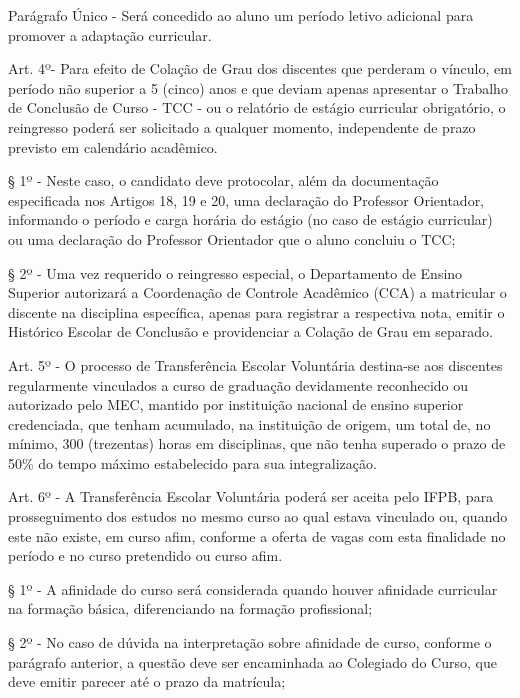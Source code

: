 Parágrafo Único - Será concedido ao aluno um período letivo adicional para promover a adaptação curricular.

\vspace{1mm}
Art. 4º- Para efeito de Colação de Grau dos discentes que perderam o vínculo, em período não superior a 5 (cinco) anos e que deviam apenas apresentar o Trabalho de Conclusão de Curso - TCC - ou o relatório de estágio curricular obrigatório, o reingresso poderá ser solicitado a qualquer momento, independente de prazo previsto em calendário acadêmico.

	§ 1º - Neste caso, o candidato deve protocolar, além da documentação especificada nos Artigos 18, 19 e 20, uma declaração do Professor Orientador, informando o período e carga horária do estágio (no caso de estágio curricular) ou uma declaração do Professor Orientador que o aluno concluiu o TCC;

	§ 2º - Uma vez requerido o reingresso especial, o Departamento de Ensino Superior autorizará a Coordenação de Controle Acadêmico (CCA) a matricular o discente na disciplina específica, apenas para registrar a respectiva nota, emitir o Histórico Escolar de Conclusão e providenciar a Colação de Grau em separado.

\vspace{1mm}
Art. 5º - O processo de Transferência Escolar Voluntária destina-se aos discentes regularmente vinculados a curso de graduação devidamente reconhecido ou autorizado pelo MEC, mantido por instituição nacional de ensino superior credenciada, que tenham acumulado, na instituição de origem, um total de, no mínimo, 300 (trezentas) horas em disciplinas, que não tenha superado o prazo de 50\% do tempo máximo estabelecido para sua integralização.

\vspace{1mm}
Art. 6º - A Transferência Escolar Voluntária poderá ser aceita pelo IFPB, para prosseguimento dos estudos no mesmo curso ao qual estava vinculado ou, quando este não existe, em curso afim, conforme a oferta de vagas com esta finalidade no período e no curso pretendido ou curso afim.

§ 1º - A afinidade do curso será considerada quando houver afinidade curricular na formação básica, diferenciando na formação profissional;

§ 2º - No caso de dúvida na interpretação sobre afinidade de curso, conforme o parágrafo anterior, a questão deve ser encaminhada ao Colegiado do Curso, que deve emitir parecer até o prazo da matrícula;

